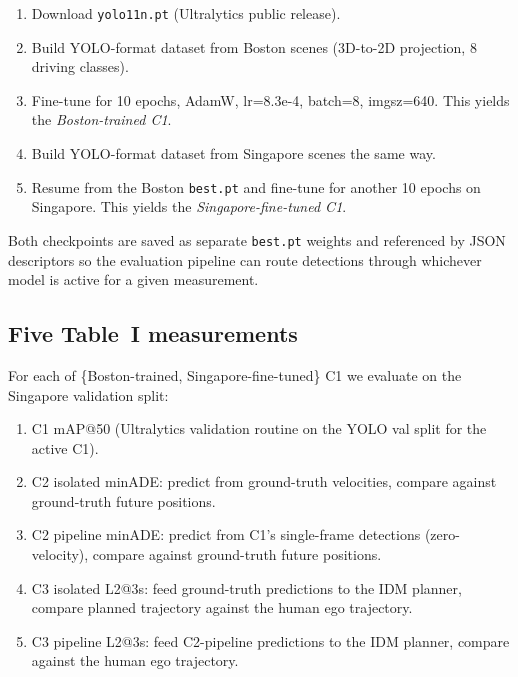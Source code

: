 \documentclass[11pt,a4paper]{article}
\begin{document}
\begin{enumerate}[noitemsep]
    \item Download \texttt{yolo11n.pt} (Ultralytics public release).
    \item Build YOLO-format dataset from Boston scenes (3D-to-2D
          projection, 8 driving classes).
    \item Fine-tune for 10 epochs, AdamW, lr=8.3e-4, batch=8,
          imgsz=640. This yields the \emph{Boston-trained C1}.
    \item Build YOLO-format dataset from Singapore scenes the same way.
    \item Resume from the Boston \texttt{best.pt} and fine-tune for
          another 10 epochs on Singapore. This yields the
          \emph{Singapore-fine-tuned C1}.
\end{enumerate}

Both checkpoints are saved as separate \texttt{best.pt} weights and
referenced by JSON descriptors so the evaluation pipeline can route
detections through whichever model is active for a given measurement.

\subsection{Five Table~I measurements}

For each of \{Boston-trained, Singapore-fine-tuned\} C1 we evaluate
on the Singapore validation split:
\begin{enumerate}[noitemsep]
    \item C1 mAP@50 (Ultralytics validation routine on the YOLO val
          split for the active C1).
    \item C2 isolated minADE: predict from ground-truth velocities,
          compare against ground-truth future positions.
    \item C2 pipeline minADE: predict from C1's single-frame
          detections (zero-velocity), compare against ground-truth
          future positions.
    \item C3 isolated L2@3s: feed ground-truth predictions to the IDM
          planner, compare planned trajectory against the human ego
          trajectory.
    \item C3 pipeline L2@3s: feed C2-pipeline predictions to the IDM
          planner, compare against the human ego trajectory.
\end{enumerate}

\end{document}
